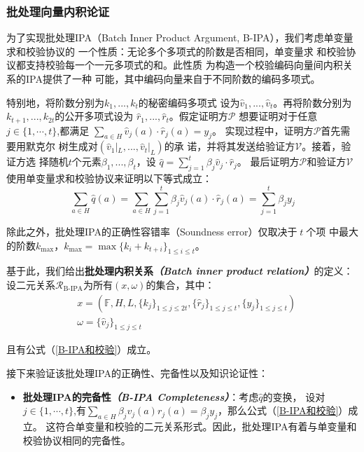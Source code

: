 \documentclass[zihao=-4]{ctexart}
\begin{document}
\begin{spacing}{1.5}
\subsubsection{批处理向量内积论证}
为了实现批处理IPA（Batch Inner Product Argument, B-IPA），我们考虑单变量求和校验协议的
一个性质：无论多个多项式的阶数是否相同，单变量求
和校验协议都支持校验每一个一元多项式的和。此性质
为构造一个校验编码向量间内积关系的IPA提供了一种
可能，其中编码向量来自于不同阶数的编码多项式。\par
特别地，将阶数分别为$k_1,...,k_t$的秘密编码多项式
设为$\hat{v}_1,...,\hat{v}_t$。再将阶数分别为
$k_{t+1},...,k_{2t}$的公开多项式设为
$\hat{r}_1,...,\hat{r}_t$。假定证明方$\mathcal{P}$
想要证明对于任意$j \in \{1,\cdots,t\}$,都满足
$\sum_{a\in H}\hat{v}_j(a)\cdot\hat{r}_j(a)=y_j$。
实现过程中，证明方$\mathcal{P}$首先需要用默克尔
树生成对$(\hat{v}_1|_L,...,\hat{v}_t|_L)$的承
诺，并将其发送给验证方$\mathcal{V}$。接着，验证方选
择随机$t$个元素$\beta_1,...,\beta_t$，设
$\hat{q}=\sum\limits_{j=1}^t\beta_j\hat{v}_j\cdot\hat{r}_j$。
最后证明方$\mathcal{P}$和验证方$\mathcal{V}$
使用单变量求和校验协议来证明以下等式成立：
\begin{equation}\sum_{a\in H}\hat{q}(a)=\sum_{a\in H}\sum\limits_{j=1}^t\beta_j\hat{v}_j(a)\cdot\hat{r}_j(a)=\sum\limits_{j=1}^t\beta_jy_j\label{B-IPA和校验}\end{equation}\par
除此之外，批处理IPA的正确性容错率（Soundness error）仅取决于$\;t\;$个项
中最大的阶数$k_{\max}$，$k_{\max}=\max\{k_i+k_{t+i}\}_{1\le i\le t}$。\par
基于此，我们给出\textbf{批处理内积关系\emph{（Batch inner product relation）}}的定义：设二元关系$\mathcal{R}_{\text{B-IPA}}$为所有$(x,\omega)$的集合，其中：
\[\begin{aligned}&x=(\mathbb{F},H,L,\{k_j\}_{1\le j\le2t},\{\hat{r}_j\}_{1\le j\le t},\{y_j\}_{1\le j\le t})\\&\omega=\{\hat{v}_j\}_{1\le j\le t}\end{aligned}\]\par
且有公式（\ref{B-IPA和校验}）成立。\par
接下来验证该批处理IPA的正确性、完备性以及知识论证性：\par
\begin{itemize}
  \item \textbf{批处理IPA的完备性\emph{（B-IPA Completeness）}}：考虑$\hat{q}$的变换，
        设对$j \in\{1,\cdots,t\}$,有$\sum_{a\in H}\beta_jv_j(a)r_j(a)=\beta_jy_j$，那么公式（\ref{B-IPA和校验}）成立。
        这符合单变量和校验的二元关系形式。因此，批处理IPA有着与单变量和校验协议相同的完备性。

\end{itemize}
\end{spacing}
\end{document}
